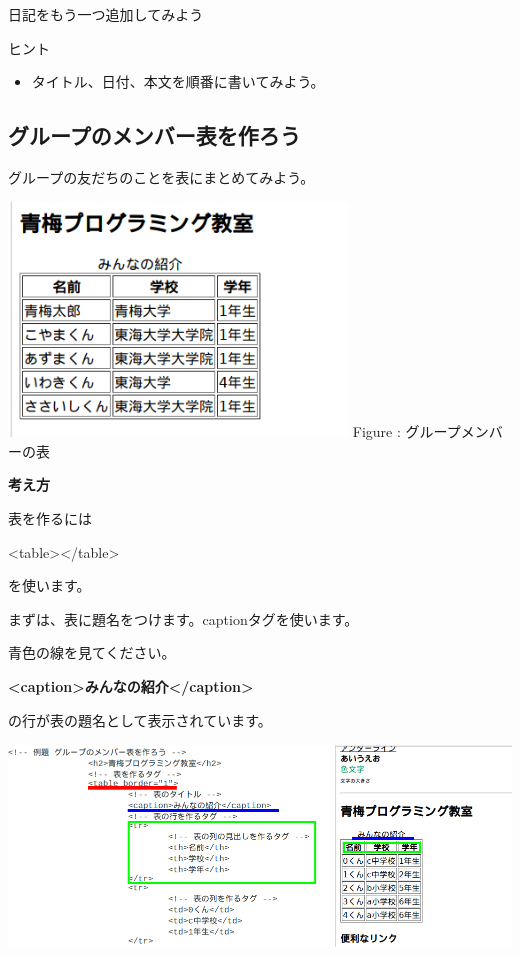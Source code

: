 \documentclass[a4paper,12pt]{jarticle}
\begin{document}
日記をもう一つ追加してみよう

ヒント

\begin{itemize}
  \item
        タイトル、日付、本文を順番に書いてみよう。
\end{itemize}
\clearpage
{}
\subsection{\theExercise グループのメンバー表を作ろう}
グループの友だちのことを表にまとめてみよう。

\centering
\begin{minipage}{8.998cm}
  {\upshape
    \includegraphics[width=8.998cm,height=6.234cm]{textbook-img189.png}
    \newline
    Figure : グループメンバーの表}
\end{minipage}

\bigskip

\flushleft
\textbf{考え方}



表を作るには

{\textless}table{\textgreater}{\textless}/table{\textgreater}

を使います。

まずは、表に題名をつけます。captionタグを使います。

青色の線を見てください。

\textbf{{\textless}caption{\textgreater}みんなの紹介{\textless}/caption{\textgreater}}

の行が表の題名として表示されています。



\bigskip

\includegraphics[width=13.462cm,height=5.387cm]{textbook-img190.png}
\end{document}
